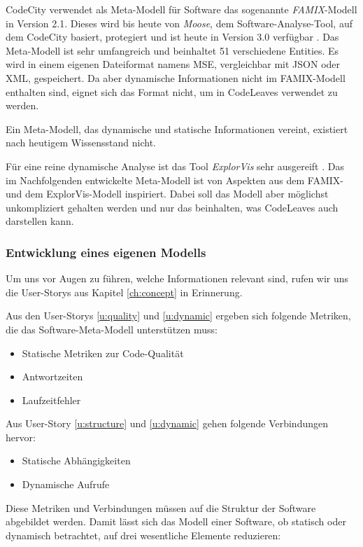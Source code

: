 CodeCity verwendet als Meta-Modell für Software das sogenannte \textit{FAMIX}-Modell in Version 2.1. Dieses wird bis heute von \textit{Moose}, dem Software-Analyse-Tool, auf dem CodeCity basiert, protegiert und ist heute in Version 3.0 verfügbar \cite{merrill1916moose}. Das Meta-Modell ist sehr umfangreich und beinhaltet 51 verschiedene Entities. Es wird in einem eigenen Dateiformat namens MSE, vergleichbar mit JSON oder XML, gespeichert. Da aber dynamische Informationen nicht im FAMIX-Modell enthalten sind, eignet sich das Format nicht, um in CodeLeaves verwendet zu werden.

Ein Meta-Modell, das dynamische und statische Informationen vereint, existiert nach heutigem Wissensstand nicht.

Für eine reine dynamische Analyse ist das Tool \textit{ExplorVis} sehr ausgereift \cite{fittkau2017software}. Das im Nachfolgenden entwickelte Meta-Modell ist von Aspekten aus dem FAMIX- und dem ExplorVis-Modell inspiriert. Dabei soll das Modell aber möglichst unkompliziert gehalten werden und nur das beinhalten, was CodeLeaves auch darstellen kann.

\subsubsection*{Entwicklung eines eigenen Modells}

Um uns vor Augen zu führen, welche Informationen relevant sind, rufen wir uns die User-Storys aus Kapitel \ref{ch:concept} in Erinnerung.

Aus den User-Storys \ref{u:quality} und \ref{u:dynamic} ergeben sich folgende Metriken, die das Software-Meta-Modell unterstützen muss:

\begin{itemize}
  \item Statische Metriken zur Code-Qualität
  \item Antwortzeiten
  \item Laufzeitfehler
\end{itemize}

Aus User-Story \ref{u:structure} und \ref{u:dynamic} gehen folgende Verbindungen hervor:

\begin{itemize}
  \item Statische Abhängigkeiten
  \item Dynamische Aufrufe
\end{itemize}

Diese Metriken und Verbindungen müssen auf die Struktur der Software abgebildet werden. Damit lässt sich das Modell einer Software, ob statisch oder dynamisch betrachtet, auf drei wesentliche Elemente reduzieren:

